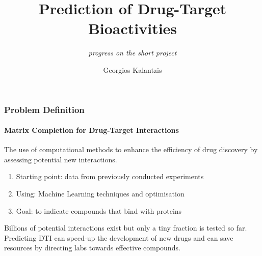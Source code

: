 \documentclass[11pt]{beamer}
\begin{document}
	\author{Georgios Kalantzis}
	\title{Prediction of Drug-Target Bioactivities}
	\subtitle{\textit{progress on the short project}}
	\date{}
	
	\vfill
\begin{frame}[plain]
	\maketitle
\end{frame}

\begin{frame}
\frametitle{Problem Definition}
\framesubtitle{Matrix Completion for Drug-Target Interactions}
The use of computational methods to enhance the efficiency of drug discovery by assessing potential new interactions.
\vspace{5mm}
\begin{enumerate}
    \item Starting point: data from previously conducted experiments
    \item Using: Machine Learning techniques and optimisation
    \item Goal: to indicate compounds that bind with proteins 
\end{enumerate}
\vspace{5mm}
\small{Billions of potential interactions exist but only a tiny fraction} is tested so far. Predicting DTI can speed-up the development of new drugs and can save resources by directing labs towards effective compounds. 
\end{frame}
\end{document}
